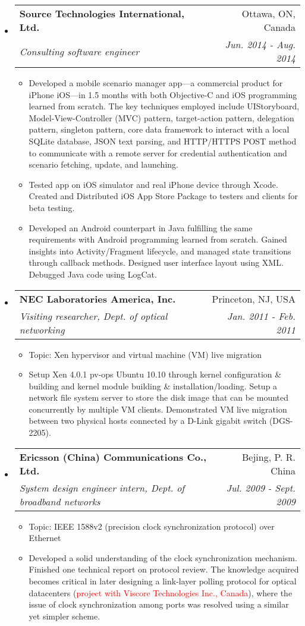 \documentclass[letterpaper,11pt]{article}
\makeatletter
\newcommand{\ressubheading}[4]{
\begin{tabular*}{6.69in}{l@{\extracolsep{\fill}}r}
        \textbf{#1} & #2 \\
        \textit{#3} & \textit{#4} \\
\end{tabular*}\vspace{-6pt}
}
\newcommand{\resitem}[1]{\item #1 \vspace{-2pt}}
\makeatother
\begin{document}
\begin{itemize}
\item
  \ressubheading{Source Technologies International, Ltd.}{Ottawa, ON, Canada}
  {Consulting software engineer}{Jun. 2014 - Aug. 2014}
  \begin{itemize}
    \resitem{Developed a mobile scenario manager app---a commercial product for iPhone iOS---in 1.5 months with both Objective-C and iOS programming learned from scratch.
    The key techniques employed include UIStoryboard, Model-View-Controller (MVC) pattern, target-action pattern, delegation pattern, singleton pattern,
    core data framework to interact with a local SQLite database, JSON text parsing,
    and HTTP/HTTPS POST method to communicate with a remote server for credential authentication and scenario fetching, update, and launching.}
    \resitem{Tested app on iOS simulator and real iPhone device through Xcode. Created and Distributed iOS App Store Package to testers and clients for beta testing.}
    \resitem{Developed an Android counterpart in Java fulfilling the same requirements with Android programming learned from scratch.
    Gained insights into Activity/Fragment lifecycle, and managed state transitions through callback methods.
    Designed user interface layout using XML. Debugged Java code using LogCat.}
  \end{itemize}

\item
    \ressubheading{NEC Laboratories America, Inc.}{Princeton, NJ, USA}%
    {Visiting researcher, Dept. of optical networking}{Jan. 2011 - Feb. 2011}
    \begin{itemize}
        \resitem{Topic: Xen hypervisor and virtual machine (VM) live migration}
        \resitem{Setup Xen 4.0.1 pv-ops Ubuntu 10.10 through kernel configuration \& building and kernel module building \& installation/loading.
        Setup a network file system server to store the disk image that can be mounted concurrently by multiple VM clients.
        Demonstrated VM live migration between two physical hosts connected by a D-Link gigabit switch (DGS-2205).}
    \end{itemize}

\item
    \ressubheading{Ericsson (China) Communications Co., Ltd.}{Bejing, P. R. China}%
    {System design engineer intern, Dept. of broadband networks}{Jul. 2009 - Sept. 2009}
    \begin{itemize}
        \resitem{Topic: IEEE 1588v2 (precision clock synchronization protocol) over Ethernet}
        \resitem{Developed a solid understanding of the clock synchronization mechanism. Finished one technical report on protocol review.
        The knowledge acquired becomes critical in later designing a link-layer polling protocol for optical datacenters (\textcolor{Red}{project with Viscore Technologies Inc., Canada}),
        where the issue of clock synchronization among ports was resolved using a similar yet simpler scheme.}
    \end{itemize}

\end{itemize}
\end{document}
